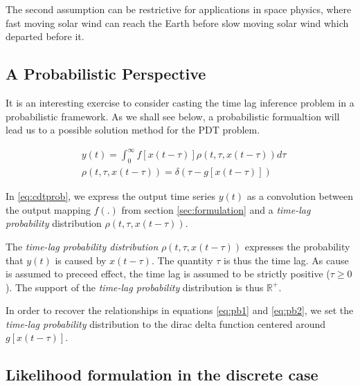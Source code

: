 \documentclass[envcountsect,runningheads]{llncs}
\theoremstyle{etoile}
\begin{document}
The second assumption can be restrictive for applications in space physics, where fast moving 
solar wind can reach the Earth before slow moving solar wind which departed before it. 

\subsection{A Probabilistic Perspective}\label{sec:cdtprobform}

It is an interesting exercise to consider casting the time lag inference problem in a probabilistic framework.
As we shall see below, a probabilistic formualtion will lead us to a possible solution method
for the PDT problem. 

\begin{align} \label{eq:cdtprob}
      &y(t) = \int_{0}^{\infty}{f[x(t - \tau)] \rho(t, \tau, x(t - \tau))}d \tau \\
      & \nonumber \rho(t, \tau, x(t - \tau))  = \delta(\tau - g[x(t - \tau)])
\end{align}

In \ref{eq:cdtprob}, we express the output time series $y(t)$ as a convolution between
the output mapping $f(.)$ from section \ref{sec:formulation} and a \emph{time-lag probability}
distribution $\rho(t, \tau, x(t - \tau))$. 

The \emph{time-lag probability distribution} $\rho(t, \tau, x(t - \tau))$ expresses the probability 
that $y(t)$ is caused by $x(t - \tau)$. The quantity $\tau$ is thus the time lag. 
As cause is assumed to preceed effect, the time lag is assumed to be strictly positive ($\tau \geq 0$). 
The support of the \emph{time-lag probability} distribution is thus $\mathbb{R}^+$.

In order to recover the relationships in equations \ref{eq:pb1} and \ref{eq:pb2}, we 
set the \emph{time-lag probability} distribution to the dirac delta function centered
around $g[x(t - \tau)]$.


\subsection{Likelihood formulation in the discrete case}
\end{document}

